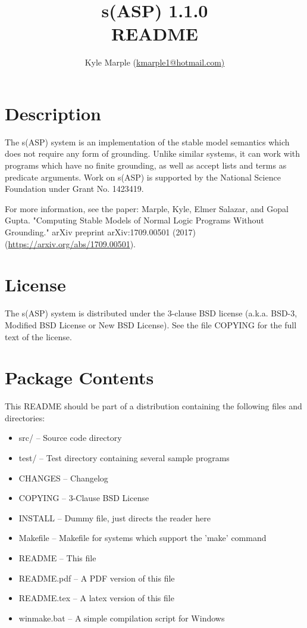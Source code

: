 \documentclass[]{article}
\title{s(ASP) 1.1.0\\README}
\author{Kyle Marple (\url{kmarple1@hotmail.com)}}
\begin{document}
\maketitle


\tableofcontents


\section{Description}

The s(ASP) system is an implementation of the stable model semantics which does
not require any form of grounding. Unlike similar systems, it can work with
programs which have no finite grounding, as well as accept lists and terms as
predicate arguments. Work on s(ASP) is supported by the National Science 
Foundation under Grant No. 1423419.

For more information, see the paper:
Marple, Kyle, Elmer Salazar, and Gopal Gupta. "Computing Stable Models of Normal
Logic Programs Without Grounding." arXiv preprint arXiv:1709.00501 (2017)
(\url{https://arxiv.org/abs/1709.00501}).


\section{License}

The s(ASP) system is distributed under the 3-clause BSD license (a.k.a. BSD-3,
Modified BSD License or New BSD License). See the file COPYING for the full text
of the license.


\section{Package Contents}

This README should be part of a distribution containing the following files and
directories:

\begin{itemize}
	\item src/ -- Source code directory
	\item test/ -- Test directory containing several sample programs
	\item CHANGES -- Changelog
	\item COPYING -- 3-Clause BSD License
	\item INSTALL -- Dummy file, just directs the reader here
	\item Makefile -- Makefile for systems which support the 'make' command
	\item README -- This file
	\item README.pdf -- A PDF version of this file
	\item README.tex -- A latex version of this file
	\item winmake.bat -- A simple compilation script for Windows
\end{itemize}
\end{document}
